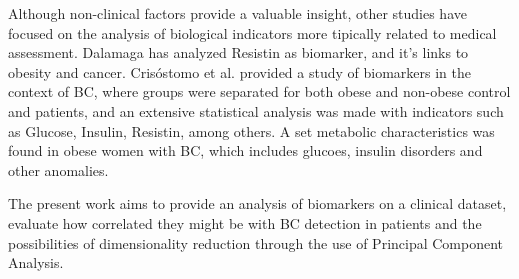 \documentclass[conference]{IEEEtran}
\begin{document}
Although non-clinical factors provide a valuable insight, other 
studies have focused on the analysis of biological indicators more 
tipically related to medical assessment. Dalamaga\cite{dalamaga2014resistin} 
has analyzed Resistin as biomarker, and it's links to obesity and 
cancer. Crisóstomo et al.\cite{crisostomo2016hyperresistinemia} provided 
a study of biomarkers in the context of BC, where groups were 
separated for both obese and non-obese control and patients, and an 
extensive statistical analysis was made with indicators such as 
Glucose, Insulin, Resistin, among others. A set metabolic characteristics 
was found in obese women with BC, which includes glucoes, insulin disorders 
and other anomalies.

The present work aims to provide an analysis of biomarkers on a clinical 
dataset, evaluate how correlated they might be with BC detection in 
patients and the possibilities of dimensionality reduction through 
the use of Principal Component Analysis.




\end{document}
